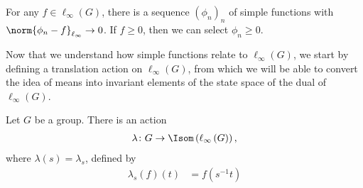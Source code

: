\documentclass[10pt]{mypackage2}
\begin{document}
\begin{corollary}
  For any $f\in \ell_{\infty}\left(G\right)$, there is a sequence $\left(\phi_n\right)_n$ of simple functions with $\norm{\phi_n -f}_{\ell_{\infty}}\rightarrow 0$. If $f\geq 0$, then we can select $\phi_n\geq 0$.
\end{corollary}
Now that we understand how simple functions relate to $\ell_{\infty}(G)$, we start by defining a translation action on $\ell_{\infty}(G)$, from which we will be able to convert the idea of means into invariant elements of the state space of the dual of $\ell_{\infty}\left(G\right)$.
\begin{proposition}\label{prop:translation_action}
  Let $G$ be a group. There is an action
  \begin{align*}
    \lambda\colon G\rightarrow \Isom\left(\ell_{\infty}\left(G\right)\right),
  \end{align*}
  where $\lambda(s) = \lambda_s$, defined by
  \begin{align*}
    \lambda_{s}\left(f\right)\left(t\right) &= f\left(s^{-1}t\right)
  \end{align*}
\end{proposition}
\end{document}
